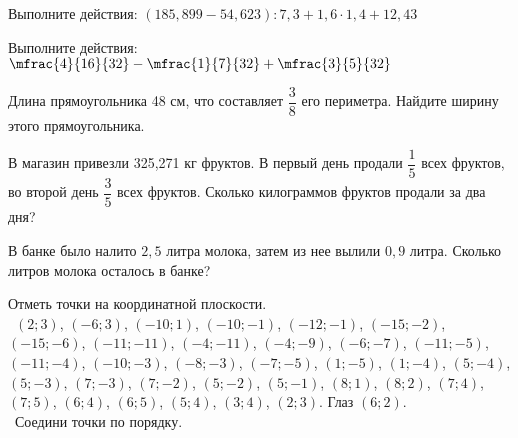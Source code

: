 \begin{exam}
	\begin{listofex}
		\item Выполните действия: \( (185,899-54,623):7,3+1,6\cdot1,4+12,43 \)
		\item Выполните действия: \( \mfrac{4}{16}{32}-\mfrac{1}{7}{32}+\mfrac{3}{5}{32} \)
		\item Длина прямоугольника 48 см, что составляет \( \dfrac{3}{8} \) его периметра. Найдите ширину этого прямоугольника.
		\item В магазин привезли 325,271 кг фруктов. В первый день продали \( \dfrac{1}{5} \) всех фруктов, во второй день \( \dfrac{3}{5} \)  всех фруктов. Сколько килограммов фруктов продали за два дня?
		\item В банке  было налито \( 2,5 \)  литра молока, затем из нее вылили  \( 0,9 \) литра. Сколько литров молока осталось в банке?
		\item Отметь точки на координатной плоскости.\\\ \( (2; 3) \), \( (-6; 3) \), \( (-10; 1) \), \( (-10; -1) \), \( (-12; -1) \), \( (-15; -2) \), \( (-15; -6) \), \( (-11; -11) \), \( (-4; -11) \), \( (-4; -9) \), \( (-6;-7) \), \( (-11; -5) \), \( (-11; -4) \), \( (-10;-3) \), \( (-8; -3) \), \( (-7; -5) \), \( (1; -5) \), \( (1; -4) \), \( (5; -4) \), \( (5; -3) \), \( (7; -3) \), \( (7; -2) \), \( (5; -2) \), \( (5; -1) \), \( (8; 1) \), \( (8; 2) \), \( (7; 4) \), \( (7; 5) \), \( (6; 4) \), \( (6; 5) \), \( (5; 4) \), \( (3; 4) \), \( (2; 3) \). Глаз \( (6; 2) \).\\\ Соедини точки по порядку.
	\end{listofex}
\end{exam}

